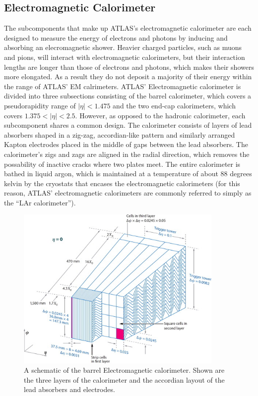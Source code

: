 \subsection{Electromagnetic Calorimeter}
The subcomponents that make up ATLAS's electromagnetic calorimeter are each designed to measure the energy of electrons and photons by inducing and absorbing an elecromagnetic shower.
Heavier charged particles, such as muons and pions, will interact with electromagnetic calorimeters, but their interaction lengths are longer than those of electrons and photons, which makes their showers more elongated.
As a result they do not deposit a majority of their energy within the range of ATLAS' EM calrimeters.
ATLAS' Electromagnetic calorimeter is divided into three subsections consisting of the barrel calorimeter, which covers a pseudorapidity range of $|\eta| < 1.475$ and the two end-cap calorimeters, which covers $1.375 < |\eta| < 2.5$.
However, as opposed to the hadronic calorimeter, each subcomponent shares a common design.
The calorimeter consists of layers of lead absorbers shaped in a zig-zag, accordian-like pattern and similarly arranged Kapton electrodes placed in the middle of gaps between the lead absorbers.
The calorimeter's zigs and zags are aligned in the radial direction, which removes the possability of inactive cracks where two plates meet.
The entire calorimeter is bathed in liquid argon, which is maintained at a temperature of about 88 degrees kelvin by the cryostats that encases the electromagnetic calorimeters (for this reason, ATLAS' electromagnetic calorimeters are commonly referred to simply as the ``LAr calorimeter'').


\begin{figure}
\begin{center}
\includegraphics[width=100mm]{figures/atlas/ElectromagneticCalorimeter.jpg}
\end{center}
  \caption{A schematic of the barrel Electromagnetic calorimeter.  Shown are the three layers of the calorimeter and the accordian layout of the lead absorbers and electrodes.}
  \label{img:EmBarrelCalorimeter}
\end{figure}


